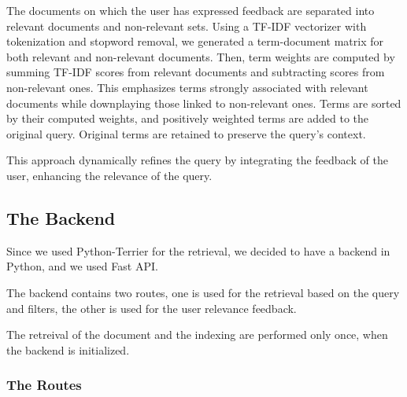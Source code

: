 \documentclass[unicode,9pt,a4paper,oneside,numbers=endperiod,openany]{scrartcl}
\begin{document}
The documents on which the user has expressed feedback are separated into relevant documents and non-relevant sets. Using a TF-IDF vectorizer with tokenization and stopword removal, we generated a term-document matrix for both relevant and non-relevant documents.
Then, term weights are computed by summing TF-IDF scores from relevant documents and subtracting scores from non-relevant ones. This emphasizes terms strongly associated with relevant documents while downplaying those linked to non-relevant ones.
Terms are sorted by their computed weights, and positively weighted terms are added to the original query. Original terms are retained to preserve the query's context.

This approach dynamically refines the query by integrating the feedback of the user, enhancing the relevance of the query.



\subsection{The Backend}

Since we used Python-Terrier for the retrieval, we decided to have a backend in Python, and we used Fast API.

The backend contains two routes, one is used for the retrieval based on the query and filters, the other is used for the user relevance feedback.

The retreival of the document and the indexing are performed only once, when the backend is initialized.

\subsubsection{The Routes}
\end{document}
